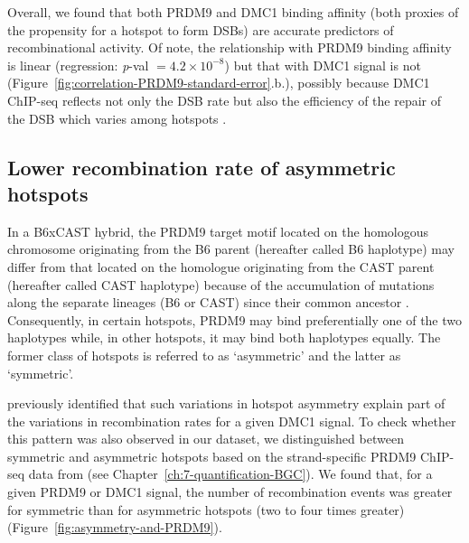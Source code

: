Overall, we found that both PRDM9 and DMC1 binding affinity (both proxies of the propensity for a hotspot to form DSBs) are accurate predictors of recombinational activity.
Of note, the relationship with PRDM9 binding affinity is linear (regression: \textit{p}-val $= 4.2 \times 10^{-8}$) but that with DMC1 signal is not (Figure~\ref{fig:correlation-PRDM9-standard-error}.b.), possibly because DMC1 ChIP-seq reflects not only the DSB rate but also the efficiency of the repair of the DSB which varies among hotspots \citep{lange2016landscape,davies2016reengineering}.


\subsection{Lower recombination rate of asymmetric hotspots}


In a B6xCAST hybrid, the PRDM9 target motif located on the homologous chromosome originating from the B6 parent (hereafter called B6 haplotype) may differ from that located on the homologue originating from the CAST parent (hereafter called CAST haplotype) because of the accumulation of mutations along the separate lineages (B6 or CAST) since their common ancestor \citep{davies2016reengineering,smagulova2016evolutionary}.
Consequently, in certain hotspots, PRDM9 may bind preferentially one of the two haplotypes while, in other hotspots, it may bind both haplotypes equally.
The former class of hotspots is referred to as ‘asymmetric’ and the latter as ‘symmetric’.

\citet{li2018highresolution} previously identified that such variations in hotspot asymmetry explain part of the variations in recombination rates for a given DMC1 signal.
To check whether this pattern was also observed in our dataset, we distinguished between symmetric and asymmetric hotspots based on the strand-specific PRDM9 ChIP-seq data from \citet{baker2015prdm9} (see Chapter~\ref{ch:7-quantification-BGC}).
We found that, for a given PRDM9 or DMC1 signal, the number of recombination events was greater for symmetric than for asymmetric hotspots (two to four times greater) (Figure~\ref{fig:asymmetry-and-PRDM9}).

